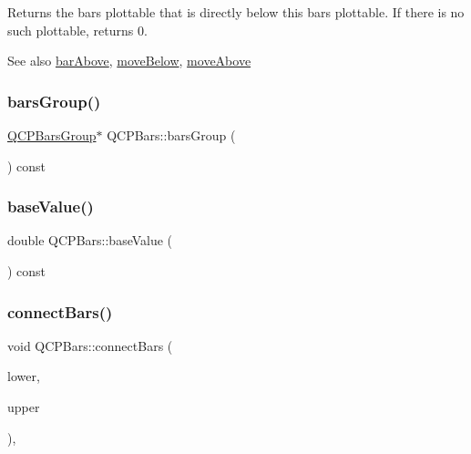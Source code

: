 Returns the bars plottable that is directly below this bars plottable. If there is no such plottable, returns 0.

\begin{DoxySeeAlso}{See also}
\mbox{\hyperlink{class_q_c_p_bars_ab97f2acd9f6cb40d2cc3c33d278f0e78}{bar\+Above}}, \mbox{\hyperlink{class_q_c_p_bars_a69fc371346980f19177c3d1ecdad78ee}{move\+Below}}, \mbox{\hyperlink{class_q_c_p_bars_ac22e00a6a41509538c21b04f0a57318c}{move\+Above}} 
\end{DoxySeeAlso}
\mbox{\label{class_q_c_p_bars_a5eef59840b68d205df4e0c3df5f97633}} 
\subsubsection{\texorpdfstring{barsGroup()}{barsGroup()}}
{\footnotesize\ttfamily \mbox{\hyperlink{class_q_c_p_bars_group}{Q\+C\+P\+Bars\+Group}}$\ast$ Q\+C\+P\+Bars\+::bars\+Group (\begin{DoxyParamCaption}{ }\end{DoxyParamCaption}) const\hspace{0.3cm}{\ttfamily [inline]}}

\mbox{\label{class_q_c_p_bars_a29a7b3b86f80b2a04bd1f9ec0ebaf422}} 
\subsubsection{\texorpdfstring{baseValue()}{baseValue()}}
{\footnotesize\ttfamily double Q\+C\+P\+Bars\+::base\+Value (\begin{DoxyParamCaption}{ }\end{DoxyParamCaption}) const\hspace{0.3cm}{\ttfamily [inline]}}

\mbox{\label{class_q_c_p_bars_a6ea37802cd22f97235cab614b14b9f19}} 
\subsubsection{\texorpdfstring{connectBars()}{connectBars()}}
{\footnotesize\ttfamily void Q\+C\+P\+Bars\+::connect\+Bars (\begin{DoxyParamCaption}\item[{\mbox{\hyperlink{class_q_c_p_bars}{Q\+C\+P\+Bars}} $\ast$}]{lower,  }\item[{\mbox{\hyperlink{class_q_c_p_bars}{Q\+C\+P\+Bars}} $\ast$}]{upper }\end{DoxyParamCaption})\hspace{0.3cm}{\ttfamily [static]}, {\ttfamily [protected]}}

